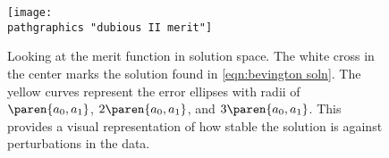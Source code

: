 \begin{figure}[t]
	\texttt{[image: \\pathgraphics "dubious II merit"]}
	\caption{Looking at the merit function in solution space. The white cross in the center marks the solution found in \eqref{eqn:bevington soln}. The yellow curves represent the error ellipses with radii of $\paren{a_{0},a_{1}}$, $2\paren{a_{0},a_{1}}$, and $3\paren{a_{0},a_{1}}$. This provides a visual representation of how stable the solution is against perturbations in the data.}
	\label{fig:dubious II merit}
\end{figure}

\endinput  %